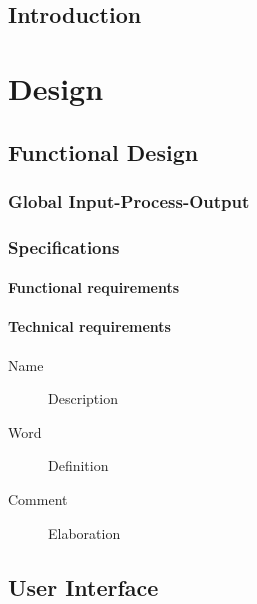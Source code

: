 \documentclass[11pt,fleqn,,a4paper,twoside,openright]{book}
\begin{document}
\cleardoublepage %

\pagestyle{fancy} %

\mainmatter
\chapter{Introduction}


\newpage
\part{Design}

\chapter{Functional Design}


\section{Global Input-Process-Output}


\section{Specifications}\label{Specification}


\subsection{Functional requirements}\label{FunctionalRequirements}


\subsection{Technical requirements}\label{TechnicalRequirements}
\begin{description}
\item[Name] Description
\item[Word] Definition
\item[Comment] Elaboration
\end{description}

\chapter{User Interface}\label{UserInterface}

\end{document}
